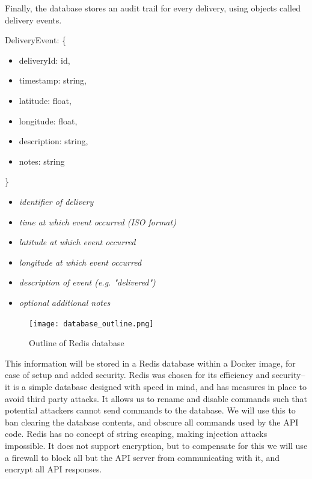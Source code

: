Finally, the database stores an audit trail for every delivery, using objects called delivery events.

\begin{minipage}{6.5cm}
DeliveryEvent: \{
\begin{itemize}
    \itemsep-0.5em
    \item[] deliveryId: id,
    \item[] timestamp: string,
    \item[] latitude: float,
    \item[] longitude: float,
    \item[] description: string,
    \item[] notes: string
\end{itemize}
\}
\end{minipage}
\begin{minipage}{10cm}
\hspace{1cm}
\begin{itemize}
    \itemsep-0.5em
    \item[] \textit{identifier of delivery}
    \item[] \textit{time at which event occurred (ISO format)}
    \item[] \textit{latitude at which event occurred}
    \item[] \textit{longitude at which event occurred}
    \item[] \textit{description of event (e.g. "delivered")}
    \item[] \textit{optional additional notes}
\end{itemize}
\hspace{1cm}
\end{minipage}
\begin{figure}[h]
\texttt{[image: database\_outline.png]}
    \centering
    \caption{Outline of Redis database}
    \label{fig:redis_database}
\end{figure}

This information will be stored in a Redis database within a Docker image, for ease of setup and added security. Redis was chosen for its efficiency and security-- it is a simple database designed with speed in mind, and has measures in place to avoid third party attacks\cite{redisSecutiry}. It allows us to rename and disable commands such that potential attackers cannot send commands to the database. We will use this to ban clearing the database contents, and obscure all commands used by the API code. Redis has no concept of string escaping, making injection attacks impossible. It does not support encryption, but to compensate for this we will use a firewall to block all but the API server from communicating with it, and encrypt all API responses.

